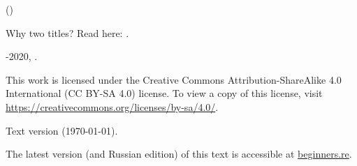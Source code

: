 ﻿\begin{titlepage}


\end{titlepage}

\newpage

\begin{center}
\vspace*{\fill}
{\LARGE \TitleMain}

\bigskip

{\large (\TitleAux)}

\bigskip
\bigskip
Why two titles? Read here: .

\vspace*{\fill}

{\large \AUTHOR}

{\large \TT{\EMAILPRI}}
\vspace*{\fill}
\vfill

\ccbysa

-2020, \AUTHOR. 

This work is licensed under the Creative Commons Attribution-ShareAlike 4.0 International (CC BY-SA 4.0) license.
To view a copy of this license, visit \url{https://creativecommons.org/licenses/by-sa/4.0/}.

Text version ({\large \today}).

The latest version (and Russian edition) of this text is accessible at \href{http://go.yurichev.com/17009}{beginners.re}.

\end{center}
